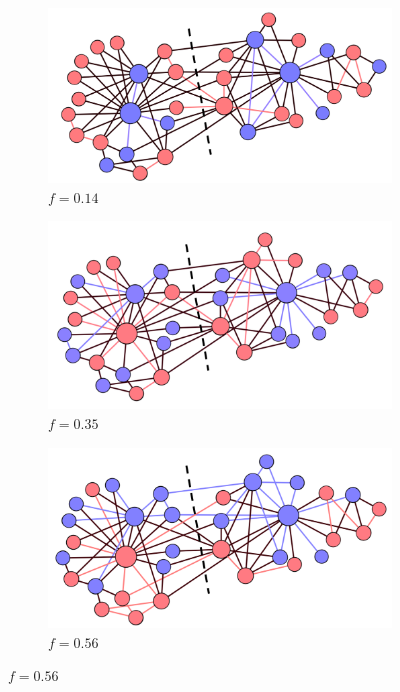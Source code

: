 \begin{figure}[!htb]
    \centering
\begin{subfigure}{.3\textwidth} 
\centering
\includegraphics[width=.99\linewidth]{img/chap2/s014.PNG}
\caption{$f=0.14$}
\end{subfigure}
\begin{subfigure}{.3\textwidth} 
\centering
\includegraphics[width=.99\linewidth]{img/chap2/s035.PNG}
\caption{$f=0.35$}
\end{subfigure}
\begin{subfigure}{.3\textwidth} 
\centering
\includegraphics[width=.99\linewidth]{img/chap2/s056.PNG}
\caption{$f=0.56$}
\end{subfigure} %
\hfill


\end{figure}
